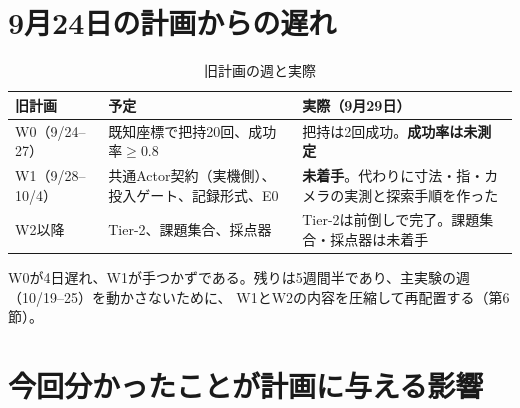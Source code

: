 \documentclass[11pt,a4paper]{article}
\begin{document}
\section{9月24日の計画からの遅れ}

\begin{table}[h]\centering\small
\caption{旧計画の週と実際}
\begin{tabularx}{\textwidth}{@{}lYY@{}}
\toprule
旧計画 & 予定 & 実際（9月29日） \\
\midrule
W0（9/24--27） & 既知座標で把持20回、成功率$\ge0.8$ & 把持は2回成功。\textbf{成功率は未測定} \\
W1（9/28--10/4） & 共通Actor契約（実機側）、投入ゲート、記録形式、E0 & \textbf{未着手}。代わりに寸法・指・カメラの実測と探索手順を作った \\
W2以降 & Tier-2、課題集合、採点器 & Tier-2は前倒しで完了。課題集合・採点器は未着手 \\
\bottomrule
\end{tabularx}
\end{table}

\noindent
W0が4日遅れ、W1が手つかずである。残りは5週間半であり、主実験の週（10/19--25）を動かさないために、
W1とW2の内容を圧縮して再配置する（第6節）。

\section{今回分かったことが計画に与える影響}
\end{document}
